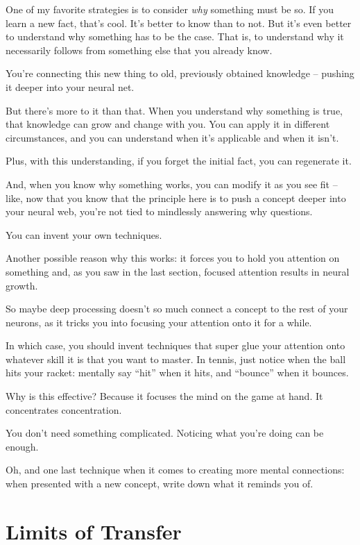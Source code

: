 One of my favorite strategies is to consider \textit{why} something must be
so. If you learn a new fact, that's cool. It's better to know than to
not. But it's even better to understand why something has to be the case. That is, to
understand why it necessarily follows from something else that you already know.

You're connecting this new thing to old, previously obtained knowledge --
pushing it deeper into your neural net.

But there's more to it than that. When you understand why something is true,
that knowledge can grow and change with you. You can apply it in different
circumstances, and you can understand when it's applicable and when it isn't.

Plus, with this understanding, if you forget the initial fact, you can
regenerate it.

And, when you know why something works, you can modify it as you see fit --
like, now that you know that the principle here is to push a concept
deeper into your neural web, you're not tied to mindlessly answering why
questions.

You can invent your own techniques.

Another possible reason why this works: it forces you to hold you
attention on something and, as you saw in the last section, focused attention
results in neural growth.

So maybe deep processing doesn't so much connect a concept to the rest of your
neurons, as it tricks you into focusing your attention onto it for a while.

In which case, you should invent techniques that super glue your attention onto
whatever skill it is that you want to master. In tennis, just notice when the
ball hits your racket: mentally say ``hit'' when it hits, and ``bounce'' when it
bounces.

Why is this effective? Because it focuses the mind on the game at hand. It
concentrates concentration.

You don't need something complicated. Noticing what you're doing can be enough.

Oh, and one last technique when it comes to creating more mental connections:
when presented with a new concept, write down what it reminds you of. 

\section{Limits of Transfer}

